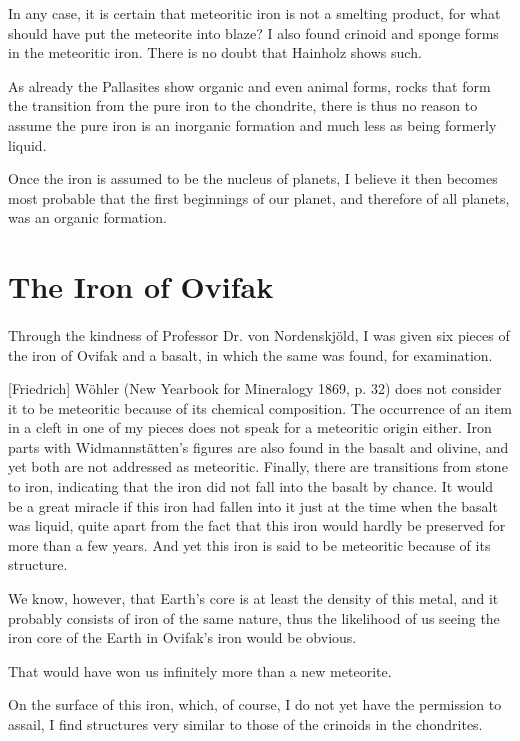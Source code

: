 \documentclass[a4paper, 11pt, oneside]{article}
\begin{document}
In any case, it is certain that meteoritic iron is not a smelting product, for what should have put the meteorite into blaze? I also found crinoid and sponge forms in the meteoritic iron. There is no doubt that Hainholz shows such.

As already the Pallasites show organic and even animal forms, rocks that form the transition from the pure iron to the chondrite, there is thus no reason to assume the pure iron is an inorganic formation and much less as being formerly liquid.

Once the iron is assumed to be the nucleus of planets, I believe it then becomes most probable that the first beginnings of our planet, and therefore of all planets, was an organic formation.
\clearpage
\section{The Iron of Ovifak}
\paragraph{}
Through the kindness of Professor Dr. von Nordenskjöld, I was given six pieces of the iron of Ovifak and a basalt, in which the same was found, for examination.

[Friedrich] Wöhler (New Yearbook for Mineralogy 1869, p. 32) does not consider it to be meteoritic because of its chemical composition. The occurrence of an item in a cleft in one of my pieces does not speak for a meteoritic origin either. Iron parts with Widmannstätten's figures are also found in the basalt and olivine, and yet both are not addressed as meteoritic. Finally, there are transitions from stone to iron, indicating that the iron did not fall into the basalt by chance. It would be a great miracle if this iron had fallen into it just at the time when the basalt was liquid, quite apart from the fact that this iron would hardly be preserved for more than a few years. And yet this iron is said to be meteoritic because of its structure.

We know, however, that Earth's core is at least the density of this metal, and it probably consists of iron of the same nature, thus the likelihood of us seeing the iron core of the Earth in Ovifak's iron would be obvious.

That would have won us infinitely more than a new meteorite.

On the surface of this iron, which, of course, I do not yet have the permission to assail, I find structures very similar to those of the crinoids in the chondrites.
\end{document}
